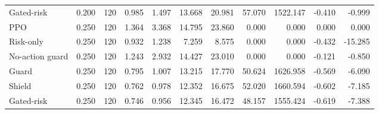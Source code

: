 \begin{tabular}{lrrrrrrrrrr}
Gated-risk & 0.200 & 120 & 0.985 & 1.497 & 13.668 & 20.981 & 57.070 & 1522.147 & -0.410 & -0.999 \\
PPO & 0.250 & 120 & 1.364 & 3.368 & 14.795 & 23.860 & 0.000 & 0.000 & 0.000 & 0.000 \\
Risk-only & 0.250 & 120 & 0.932 & 1.238 & 7.259 & 8.575 & 0.000 & 0.000 & -0.432 & -15.285 \\
No-action guard & 0.250 & 120 & 1.243 & 2.932 & 14.427 & 23.010 & 0.000 & 0.000 & -0.121 & -0.850 \\
Guard & 0.250 & 120 & 0.795 & 1.007 & 13.215 & 17.770 & 50.624 & 1626.958 & -0.569 & -6.090 \\
Shield & 0.250 & 120 & 0.762 & 0.978 & 12.352 & 16.675 & 52.020 & 1660.594 & -0.602 & -7.185 \\
Gated-risk & 0.250 & 120 & 0.746 & 0.956 & 12.345 & 16.472 & 48.157 & 1555.424 & -0.619 & -7.388 \\
\bottomrule
\end{tabular}
